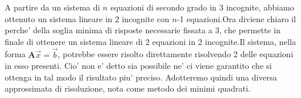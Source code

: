 A partire da un sistema di $n$ equazioni di secondo grado in 3 incognite, abbiamo ottenuto un sistema lineare in 2 incognite con $n$-1 equazioni.\newline Ora diviene chiaro il perche' della soglia minima di risposte necessarie fissata a 3, che permette in finale di ottenere un sistema lineare di 2 equazioni in 2 incognite.\newline Il sistema, nella forma $\textbf{A}\overrightarrow{x}=\overrightarrow{b}$, potrebbe essere risolto direttamente risolvendo 2 delle equazioni in esso presenti. Cio' non e' detto sia possibile ne' ci viene garantito che si ottenga in tal modo il risultato piu' preciso. Adotteremo quindi una diversa approssimata di risoluzione, nota come metodo dei minimi quadrati.\newline


